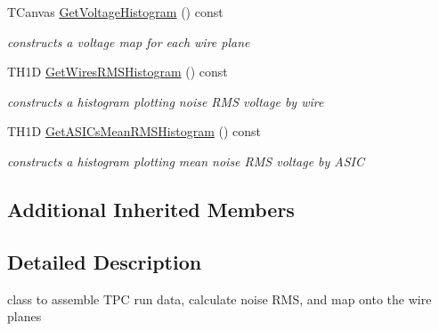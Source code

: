 \begin{DoxyCompactItemize}
\item 
T\+Canvas \hyperlink{class_t_t_p_c_data_handler_a9d6593f7367185252aaac9ad0290c8f7}{Get\+Voltage\+Histogram} () const 
\begin{DoxyCompactList}\small\item\em constructs a voltage map for each wire plane \end{DoxyCompactList}\item 
T\+H1\+D \hyperlink{class_t_t_p_c_data_handler_acba4e4d412a5c6b86684ecef640c663c}{Get\+Wires\+R\+M\+S\+Histogram} () const 
\begin{DoxyCompactList}\small\item\em constructs a histogram plotting noise R\+M\+S voltage by wire \end{DoxyCompactList}\item 
T\+H1\+D \hyperlink{class_t_t_p_c_data_handler_a73a4c890154ff9da105a8606630c7500}{Get\+A\+S\+I\+Cs\+Mean\+R\+M\+S\+Histogram} () const 
\begin{DoxyCompactList}\small\item\em constructs a histogram plotting mean noise R\+M\+S voltage by A\+S\+I\+C \end{DoxyCompactList}\end{DoxyCompactItemize}
\subsection*{Additional Inherited Members}


\subsection{Detailed Description}
class to assemble T\+P\+C run data, calculate noise R\+M\+S, and map onto the wire planes 

